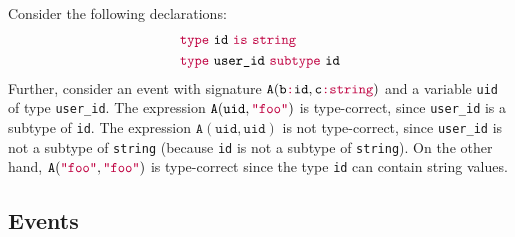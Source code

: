 \documentclass[runningheads]{llncs}
\newcommand{\kw}[1]{{\color{purple}\texttt{#1}}}
\begin{document}
\begin{example}
  Consider the following declarations:
  \begin{align*}
    &\kw{type}~\texttt{id}~\kw{is}~\kw{string}\\
    &\kw{type}~\texttt{user\_id}~\kw{subtype}~\texttt{id}
  \end{align*}
  Further, consider an event with signature
  $\texttt{A}(\texttt{b}\kw{:}\texttt{id}, \texttt{c}\kw{:}\kw{string})$
  and a variable \texttt{uid} of type \texttt{user\_id}. The expression
  $\texttt{A}(\texttt{uid},\kw{"foo"})$ is type-correct, since \texttt{user\_id}
  is a subtype of \texttt{id}. The expression $\texttt{A}(\texttt{uid},\texttt{uid})$ is
  not type-correct, since \texttt{user\_id} is not a subtype of \kw{string}
  (because \texttt{id} is not a subtype of \kw{string}). On the other hand,
  $\texttt{A}(\kw{"foo"},\kw{"foo"})$ is type-correct since the type \texttt{id} can
  contain string values.
\end{example}

\subsection{Events}
\end{document}

